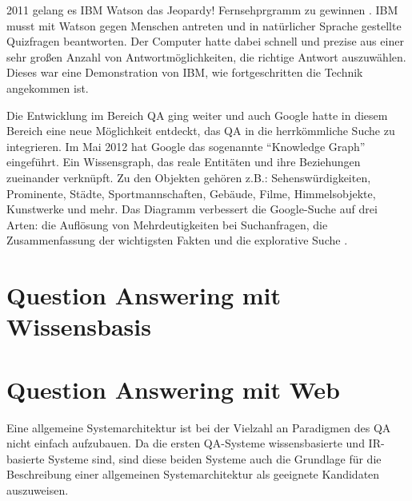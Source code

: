 \documentclass[
        ngerman,
        paper=a4,
        numbers=noendperiod,
]{scrreprt}
\begin{document}
2011 gelang es IBM Watson das Jeopardy! Fernsehprgramm zu gewinnen \citep{Markoff2011ComputerNot}. IBM musst mit Watson gegen Menschen antreten und in natürlicher Sprache gestellte Quizfragen beantworten. Der Computer hatte dabei schnell und prezise aus einer sehr großen Anzahl von Antwortmöglichkeiten, die richtige Antwort auszuwählen. Dieses war eine Demonstration von IBM, wie fortgeschritten die Technik angekommen ist.

Die Entwicklung im Bereich QA ging weiter und auch Google hatte in diesem Bereich eine neue Möglichkeit entdeckt, das QA in die herrkömmliche Suche zu integrieren. Im Mai 2012 hat Google das sogenannte \enquote{Knowledge Graph} eingeführt. Ein Wissensgraph, das reale Entitäten und ihre Beziehungen zueinander verknüpft. Zu den Objekten gehören z.B.: Sehenswürdigkeiten, Prominente, Städte, Sportmannschaften, Gebäude, Filme, Himmelsobjekte, Kunstwerke und mehr. Das Diagramm verbessert die Google-Suche auf drei Arten: die Auflösung von Mehrdeutigkeiten bei Suchanfragen, die Zusammenfassung der wichtigsten Fakten und die explorative Suche \citep{SteinerAddingGraph}.











































\chapter{Question Answering mit Wissensbasis}
\chapter{Question Answering mit Web}
Eine allgemeine Systemarchitektur ist bei der Vielzahl an Paradigmen des QA nicht einfach aufzubauen. Da die ersten QA-Systeme wissensbasierte und IR-basierte Systeme sind, sind diese beiden Systeme auch die Grundlage für die Beschreibung einer allgemeinen Systemarchitektur als geeignete Kandidaten auszuweisen. 
\end{document}
